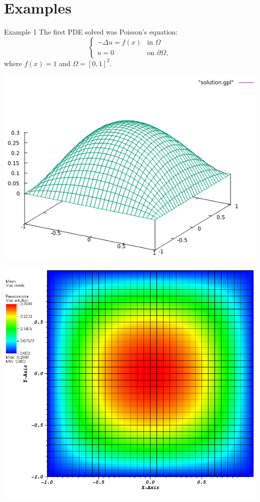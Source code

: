 \documentclass[9pt]{beamer}
\newcommand{\lap}{\Delta}
\begin{document}
\section{Examples}
\begin{frame}{Example 1}
The first PDE solved was Poisson's equation:
$$
\begin{cases}
-\lap u = f(x) &\text{in }\Omega\\
u = 0 & \text{on }\partial\Omega,
\end{cases}
$$
where $f(x) = 1$ and $\Omega = [0,1]^2$.

\begin{minipage}{.5\paperwidth}
\centering
\includegraphics[scale=.39]{Solu1-gnuplot.png}
\end{minipage}%
\begin{minipage}{.4\paperwidth}
\centering
\includegraphics[scale=.7]{Solu1-visit.png}
\end{minipage}
\end{frame}
\end{document}
